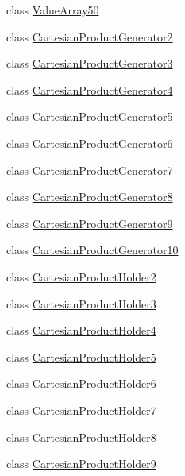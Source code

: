 \begin{DoxyCompactItemize}
class \hyperlink{classtesting_1_1internal_1_1_value_array50}{Value\-Array50}
\item 
class \hyperlink{classtesting_1_1internal_1_1_cartesian_product_generator2}{Cartesian\-Product\-Generator2}
\item 
class \hyperlink{classtesting_1_1internal_1_1_cartesian_product_generator3}{Cartesian\-Product\-Generator3}
\item 
class \hyperlink{classtesting_1_1internal_1_1_cartesian_product_generator4}{Cartesian\-Product\-Generator4}
\item 
class \hyperlink{classtesting_1_1internal_1_1_cartesian_product_generator5}{Cartesian\-Product\-Generator5}
\item 
class \hyperlink{classtesting_1_1internal_1_1_cartesian_product_generator6}{Cartesian\-Product\-Generator6}
\item 
class \hyperlink{classtesting_1_1internal_1_1_cartesian_product_generator7}{Cartesian\-Product\-Generator7}
\item 
class \hyperlink{classtesting_1_1internal_1_1_cartesian_product_generator8}{Cartesian\-Product\-Generator8}
\item 
class \hyperlink{classtesting_1_1internal_1_1_cartesian_product_generator9}{Cartesian\-Product\-Generator9}
\item 
class \hyperlink{classtesting_1_1internal_1_1_cartesian_product_generator10}{Cartesian\-Product\-Generator10}
\item 
class \hyperlink{classtesting_1_1internal_1_1_cartesian_product_holder2}{Cartesian\-Product\-Holder2}
\item 
class \hyperlink{classtesting_1_1internal_1_1_cartesian_product_holder3}{Cartesian\-Product\-Holder3}
\item 
class \hyperlink{classtesting_1_1internal_1_1_cartesian_product_holder4}{Cartesian\-Product\-Holder4}
\item 
class \hyperlink{classtesting_1_1internal_1_1_cartesian_product_holder5}{Cartesian\-Product\-Holder5}
\item 
class \hyperlink{classtesting_1_1internal_1_1_cartesian_product_holder6}{Cartesian\-Product\-Holder6}
\item 
class \hyperlink{classtesting_1_1internal_1_1_cartesian_product_holder7}{Cartesian\-Product\-Holder7}
\item 
class \hyperlink{classtesting_1_1internal_1_1_cartesian_product_holder8}{Cartesian\-Product\-Holder8}
\item 
class \hyperlink{classtesting_1_1internal_1_1_cartesian_product_holder9}{Cartesian\-Product\-Holder9}

\end{DoxyCompactItemize}
